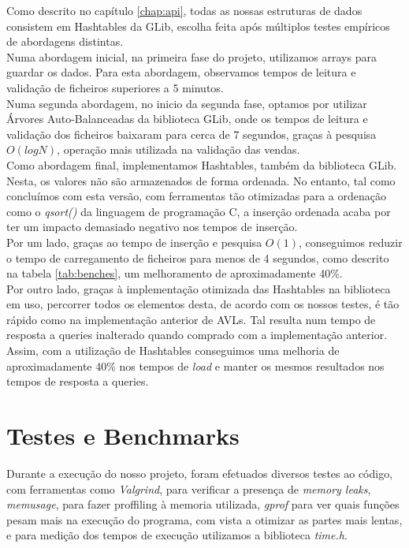 \documentclass[a4paper]{report}
\begin{document}
Como descrito no capítulo \ref{chap:api}, todas as nossas estruturas de dados consistem 
em Hashtables da GLib, escolha feita após múltiplos testes empíricos de abordagens distintas.\\
Numa abordagem inicial, na primeira fase do projeto, utilizamos arrays para 
guardar os dados. Para esta abordagem, observamos tempos de leitura e validação de ficheiros
superiores a 5 minutos.\\
Numa segunda abordagem, no inicio da segunda fase, optamos por utilizar 
Árvores Auto-Balanceadas da biblioteca GLib, onde os tempos de leitura e validação 
dos ficheiros baixaram para cerca de 7 segundos, graças à pesquisa $O(log N)$,
operação mais utilizada na validação das vendas.\\
Como abordagem final, implementamos Hashtables, também da biblioteca GLib.
Nesta, os valores não são armazenados de forma ordenada. No entanto,
tal como concluímos com esta versão, com ferramentas tão otimizadas para a ordenação
como o \textit{qsort()} da linguagem de programação C, a inserção ordenada acaba por ter
um impacto demasiado negativo nos tempos de inserção.\\
Por um lado, graças ao tempo de inserção e pesquisa $O(1)$, conseguimos reduzir
o tempo de carregamento de ficheiros para menos de 4 segundos, como descrito
na tabela \ref{tab:benches}, um melhoramento de aproximadamente 40\%.\\
Por outro lado, graças à implementação otimizada das Hashtables na biblioteca em uso,
percorrer todos os elementos desta, de acordo com os nossos testes, é tão rápido como
na implementação anterior de AVLs. Tal resulta num tempo de resposta a queries
inalterado quando comprado com a implementação anterior.\\
Assim, com a utilização de Hashtables conseguimos uma melhoria de
aproximadamente 40\% nos tempos de \textit{load} e manter os mesmos resultados nos
tempos de resposta a queries.

\chapter{Testes e Benchmarks}

Durante a execução do nosso projeto, foram efetuados diversos testes ao código, com
ferramentas como \textit{Valgrind}, para verificar a presença de \textit{memory 
leaks}, \textit{memusage}, para fazer proffiling à memoria utilizada, \textit{gprof}
para ver quais funções pesam mais na execução do programa, com vista a otimizar as
partes mais lentas, e para medição dos tempos de execução utilizamos a biblioteca
\textit{time.h}.
\end{document}

